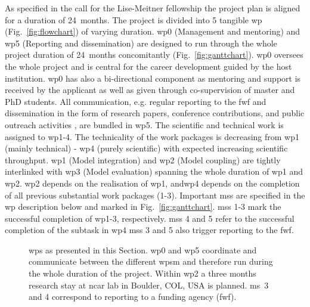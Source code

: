 As specified in the call for the Lise-Meitner fellowship the project plan is aligned for a duration of 24~months. The project is divided into 5 tangible \gls{wp} (Fig.~\ref{fig:flowchart}) of varying duration. \gls{wp}0 (Management and mentoring) and \gls{wp}5 (Reporting and dissemination) are designed to run through the whole project duration of 24~months concomitantly (Fig.~\ref{fig:ganttchart}). \gls{wp}0 oversees the whole project and is central for the career development guided by the host institution. \gls{wp}0 has also a bi-directional component as mentoring and support is received by the applicant as well as given through co-supervision of master and PhD students. All communication, e.g. regular reporting to the \gls{fwf} and dissemination in the form of research papers, conference contributions, and public outreach activities , are bundled in \gls{wp}5. The scientific and technical work is assigned to \gls{wp}1-4. The technicality of the work packages is decreasing from \gls{wp}1 (mainly technical) - \gls{wp}4 (purely scientific) with expected increasing scientific throughput. \gls{wp}1 (Model integration) and \gls{wp}2 (Model coupling) are tightly interlinked with \gls{wp}3 (Model evaluation) spanning the whole duration of \gls{wp}1 and \gls{wp}2. \gls{wp}2 depends on the realisation of \gls{wp}1, and\gls{wp}4 depends on the completion of all previous substantial work packages (1-3). Important \glspl{ms} are specified in the \gls{wp} description below and marked  in Fig.~\ref{fig:ganttchart}. 
\glspl{ms} 1-3 mark the successful completion of \gls{wp}1-3, respectively. \glspl{ms} 4 and 5 refer to the successful completion of the subtask in \gls{wp}4 \glspl{ms} 3 and 5 also trigger reporting to the \gls{fwf}.

\begin{figure}
  \centering
  \caption{\glspl{wp} as presented in this Section. \gls{wp}0 and \gls{wp}5 coordinate and communicate between the different \glspl{wp}m and therefore run during the whole duration of the project. Within \gls{wp}2 a three months research stay at \gls{ncar} lab in Boulder, COL, USA is planned. \gls{ms}~3 and 4 correspond to reporting to a funding agency (\gls{fwf}).
}
\end{figure}


